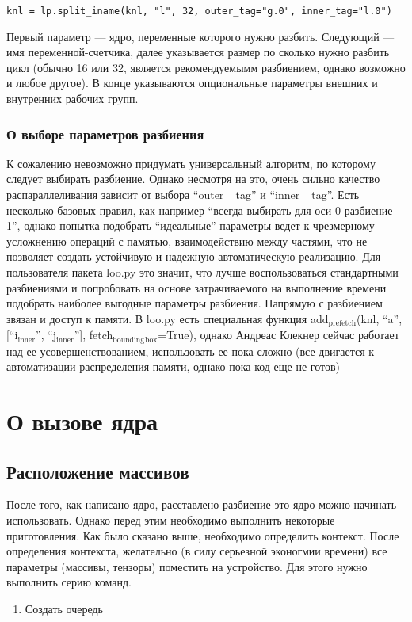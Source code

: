 \documentclass{scrartcl}
\begin{document}
\begin{verbatim}
knl = lp.split_iname(knl, "l", 32, outer_tag="g.0", inner_tag="l.0")
\end{verbatim}
Первый параметр --- ядро, переменные которого нужно разбить. Следующий --- имя
переменной-счетчика, далее указывается размер по сколько нужно разбить цикл
(обычно 16 или 32, является рекомендуемымм разбиением, однако возможно и любое
другое). В конце указываются опциональные параметры внешних и внутренних рабочих 
групп. 
\subsubsection{О выборе параметров разбиения}
\label{sec-7-5-1}

К сожалению невозможно придумать универсальный алгоритм, по которому следует 
выбирать разбиение. Однако несмотря на это, очень сильно качество распараллеливания
зависит от выбора ``outer\_{} tag'' и ``inner\_{} tag''. Есть несколько базовых правил,
как например ``всегда выбирать для оси 0 разбиение 1'', однако попытка подобрать 
``идеальные'' параметры ведет к чрезмерному усложнению операций с памятью, 
взаимодействию между частями, что не позволяет создать устойчивую и надежную
автоматическую реализацию. Для пользователя пакета loo.py это значит, что 
лучше воспользоваться стандартными разбиениями и попробовать на основе 
затрачиваемого на выполнение времени подобрать наиболее выгодные параметры
разбиения.
Напрямую с разбиением звязан и доступ к памяти. В loo.py есть специальная
функция add$_{\mathrm{prefetch}}$(knl, ``a'', [``i$_{\mathrm{inner}}$'', ``j$_{\mathrm{inner}}$''], fetch$_{\mathrm{bounding}}$$_{\mathrm{box}}$=True),
однако Андреас Клекнер сейчас работает над ее усовершенствованием, использовать 
ее пока сложно (все двигается к автоматизации распределения памяти, однако пока
код еще не готов) 
\section{О вызове ядра}
\label{sec-8}
\subsection{Расположение массивов}
\label{sec-8-1}

После того, как написано ядро, расставлено разбиение это ядро можно начинать 
использовать. Однако перед этим необходимо выполнить некоторые приготовления.
Как было сказано выше, необходимо определить контекст. После определения контекста,
желательно (в силу серьезной эконогмии времени) все параметры (массивы, тензоры)
поместить на устройство. Для этого нужно выполнить серию команд.
\begin{enumerate}
\item Создать очередь
\end{enumerate}
\end{document}
